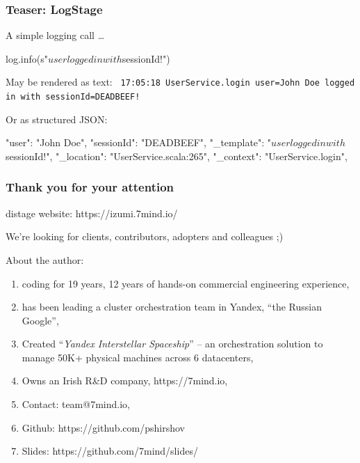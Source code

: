 \documentclass[usenames,dvipsnames]{beamer}
\begin{document}
\begin{frame}[fragile]
  \frametitle{Teaser: LogStage}
  A simple logging call \dots
  \begin{scalacode}
log.info(s"$user logged in with $sessionId!")
  \end{scalacode}

  May be rendered as text:
  \newline
  \texttt{
  17:05:18 UserService.login user=John Doe logged in with sessionId=DEADBEEF!
  }
  \newline

  Or as structured JSON:
  \begin{jsoncode}
{
  "user": "John Doe",
  "sessionId": "DEADBEEF",
  "_template": "$user logged in with $sessionId!",
  "_location": "UserService.scala:265",
  "_context": "UserService.login",
}
  \end{jsoncode}
\end{frame}

\begin{frame}
    \frametitle{Thank you for your attention}

    \begin{center}
      distage website: https://izumi.7mind.io/

      We're looking for clients, contributors, adopters and colleagues ;)
    \end{center}

    About the author:
    \begin{enumerate}
        \item coding for 19 years, 12 years of hands-on commercial engineering experience,
        \item has been leading a cluster orchestration team in Yandex, ``the Russian Google'',
        \item Created ``\textit{Yandex Interstellar Spaceship}'' -- an orchestration solution to manage 50K+ physical machines across 6 datacenters,
        \item Owns an Irish R\&D company, https://7mind.io,
        \item Contact: team@7mind.io,
        \item Github: https://github.com/pshirshov
        \item Slides: https://github.com/7mind/slides/
    \end{enumerate}
\end{frame}
\end{document}
